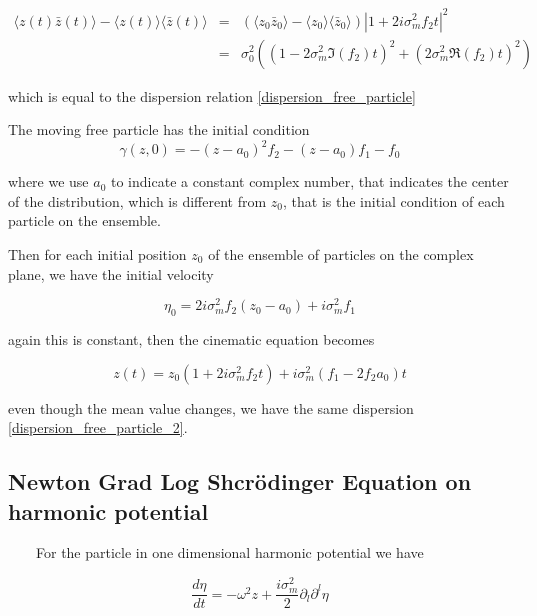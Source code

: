\documentclass[a4paper,12pt]{article}
\begin{document}
\begin{eqnarray}
\langle z(t) \bar z(t) \rangle -  \langle z(t) \rangle \langle \bar z(t) \rangle  & = & 
(\langle z_0 \bar z_0 \rangle -  \langle z_0 \rangle \langle \bar z_0 \rangle)|1+2i\sigma_m^2f_2t|^2 \nonumber \\
& = & \sigma_0^2 \left( (1 - 2\sigma_m^2\Im(f_2)t)^2 + (2\sigma_m^2\Re(f_2)t)^2 \right) \label{dispersion_free_particle_2}
\end{eqnarray}

which is equal to the dispersion relation \ref{dispersion_free_particle}


The moving free particle has the initial condition 
\begin{equation}
\gamma(z,0) = -(z-a_0)^2 f_2 - (z-a_0) f_1 - f_0
\end{equation} 

where we use $a_0$ to indicate a constant complex number, that indicates the center of the distribution, which is different from $z_0$, that is the initial condition of each particle on the ensemble.

Then for each initial position $z_0$ of the ensemble of particles  on the complex plane, we have the initial velocity

\begin{equation}
\eta_0 = 2 i \sigma_m^2 f_2 (z_0 - a_0) + i \sigma_m^2 f_1
\end{equation}

again this is constant, then the cinematic equation becomes

\begin{equation}
z(t) = z_0(1+2i\sigma_m^2f_2t) + i\sigma_m^2(f_1 - 2f_2a_0)t
\end{equation}

even though the mean value changes, we have the same dispersion \ref{dispersion_free_particle_2}.



\subsection{Newton Grad Log Shcr\"odinger Equation on harmonic potential}

~~~~For the particle in one dimensional harmonic potential we have

\begin{equation}
\frac{d \eta}{dt} = - \omega^2 z + \frac{i\sigma_m^2}{2 } \partial_l \partial^l \eta
\end{equation}
\end{document}
